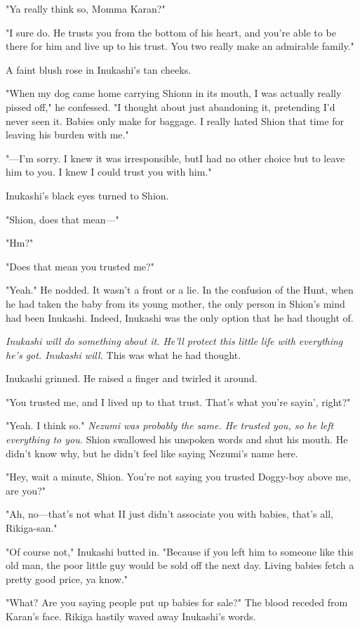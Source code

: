"Ya really think so, Momma Karan?"

"I sure do. He trusts you from the bottom of his heart, and you're able
to be there for him and live up to his trust. You two really make an
admirable family."

A faint blush rose in Inukashi's tan cheeks.

"When my dog came home carrying Shionn in its mouth, I was actually
really pissed off," he confessed. "I thought about just abandoning it,
pretending I'd never seen it. Babies only make for baggage. I really
hated Shion that time for leaving his burden with me."

"---I'm sorry. I knew it was irresponsible, but\el I had no other choice
but to leave him to you. I knew I could trust you with him."

Inukashi's black eyes turned to Shion.

"Shion, does that mean---"

"Hm?"

"Does that mean you trusted me?"

"Yeah." He nodded. It wasn't a front or a lie. In the confusion of the
Hunt, when he had taken the baby from its young mother, the only person
in Shion's mind had been Inukashi. Indeed, Inukashi was the only option
that he had thought of.

\emph{Inukashi will do something about it. He'll protect this little life with
everything he's got. Inukashi will.} This was what he had thought.

Inukashi grinned. He raised a finger and twirled it around.

"You trusted me, and I lived up to that trust. That's what you're
sayin', right?"

"Yeah. I think so." \emph{Nezumi was probably the same. He trusted you, so he
left everything to you.} Shion swallowed his unspoken words and shut his
mouth. He didn't know why, but he didn't feel like saying Nezumi's name
here.

"Hey, wait a minute, Shion. You're not saying you trusted Doggy-boy
above me, are you?"

"Ah, no---that's not what I\el I just didn't associate you with babies,
that's all, Rikiga-san."

"Of course not," Inukashi butted in. "Because if you left him to someone
like this old man, the poor little guy would be sold off the next day.
Living babies fetch a pretty good price, ya know."

"What? Are you saying people put up babies for sale?" The blood receded
from Karan's face. Rikiga hastily waved away Inukashi's words.

